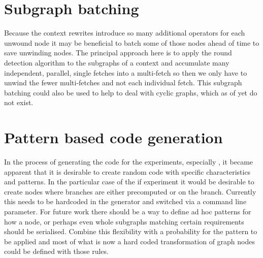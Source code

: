 \section{Subgraph batching}

Because the context rewrites introduce so many additional operators for each unwound node it may be beneficial to batch some of those nodes ahead of time to save unwinding nodes.
The principal approach here is to apply the round detection algorithm to the subgraphs of a context and accumulate many independent, parallel, single fetches into a multi-fetch so then we only have to unwind the fewer multi-fetches and not each individual fetch.
This subgraph batching could also be used to help \yauhau{} to deal with cyclic graphs, which as of yet do not exist.

\section{Pattern based code generation}

In the process of generating the code for the experiments, especially \ifop{}, it became apparent that it is desirable to create random code with specific characteristics and patterns.
In the particular case of the if experiment it would be desirable to create nodes where branches are either precomputed or on the branch.
Currently this needs to be hardcoded in the generator and switched via a command line parameter.
For future work there should be a way to define ad hoc patterns for how a node, or perhaps even whole subgraphs matching certain requirements should be serialised.
Combine this flexibility with a probability for the pattern to be applied and most of what is now a hard coded transformation of graph nodes could be defined with those rules.
